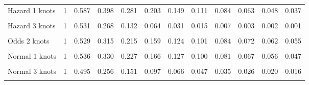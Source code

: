 \documentclass[
]{article}
\begin{document}
\begin{table}[H]
{\begin{tabular}[t]{lrrrrrrrrrrr}
Hazard 1 knots & 1 & 0.587 & 0.398 & 0.281 & 0.203 & 0.149 & 0.111 & 0.084 & 0.063 & 0.048 & 0.037\\
\cellcolor{gray!10}{Hazard 2 knots} & \cellcolor{gray!10}{1} & \cellcolor{gray!10}{0.561} & \cellcolor{gray!10}{0.336} & \cellcolor{gray!10}{0.206} & \cellcolor{gray!10}{0.128} & \cellcolor{gray!10}{0.080} & \cellcolor{gray!10}{0.051} & \cellcolor{gray!10}{0.032} & \cellcolor{gray!10}{0.021} & \cellcolor{gray!10}{0.013} & \cellcolor{gray!10}{0.009}\\
Hazard 3 knots & 1 & 0.531 & 0.268 & 0.132 & 0.064 & 0.031 & 0.015 & 0.007 & 0.003 & 0.002 & 0.001\\
\cellcolor{gray!10}{Odds 1 knots} & \cellcolor{gray!10}{1} & \cellcolor{gray!10}{0.555} & \cellcolor{gray!10}{0.362} & \cellcolor{gray!10}{0.264} & \cellcolor{gray!10}{0.206} & \cellcolor{gray!10}{0.167} & \cellcolor{gray!10}{0.140} & \cellcolor{gray!10}{0.121} & \cellcolor{gray!10}{0.105} & \cellcolor{gray!10}{0.093} & \cellcolor{gray!10}{0.084}\\
Odds 2 knots & 1 & 0.529 & 0.315 & 0.215 & 0.159 & 0.124 & 0.101 & 0.084 & 0.072 & 0.062 & 0.055\\
\cellcolor{gray!10}{Odds 3 knots} & \cellcolor{gray!10}{1} & \cellcolor{gray!10}{0.494} & \cellcolor{gray!10}{0.256} & \cellcolor{gray!10}{0.158} & \cellcolor{gray!10}{0.109} & \cellcolor{gray!10}{0.080} & \cellcolor{gray!10}{0.062} & \cellcolor{gray!10}{0.050} & \cellcolor{gray!10}{0.041} & \cellcolor{gray!10}{0.035} & \cellcolor{gray!10}{0.030}\\
Normal 1 knots & 1 & 0.536 & 0.330 & 0.227 & 0.166 & 0.127 & 0.100 & 0.081 & 0.067 & 0.056 & 0.047\\
\cellcolor{gray!10}{Normal 2 knots} & \cellcolor{gray!10}{1} & \cellcolor{gray!10}{0.534} & \cellcolor{gray!10}{0.327} & \cellcolor{gray!10}{0.223} & \cellcolor{gray!10}{0.163} & \cellcolor{gray!10}{0.124} & \cellcolor{gray!10}{0.098} & \cellcolor{gray!10}{0.079} & \cellcolor{gray!10}{0.065} & \cellcolor{gray!10}{0.054} & \cellcolor{gray!10}{0.046}\\
Normal 3 knots & 1 & 0.495 & 0.256 & 0.151 & 0.097 & 0.066 & 0.047 & 0.035 & 0.026 & 0.020 & 0.016\\
\cellcolor{gray!10}{Mixture cure Weibull} & \cellcolor{gray!10}{1} & \cellcolor{gray!10}{0.652} & \cellcolor{gray!10}{0.652} & \cellcolor{gray!10}{0.652} & \cellcolor{gray!10}{0.652} & \cellcolor{gray!10}{0.652} & \cellcolor{gray!10}{0.652} & \cellcolor{gray!10}{0.652} & \cellcolor{gray!10}{0.652} & \cellcolor{gray!10}{0.652} & \cellcolor{gray!10}{0.652}\\

\end{tabular}}
\end{table}
\end{document}
